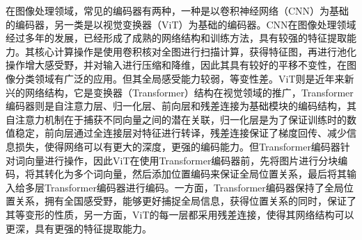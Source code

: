 \documentclass{Diploma}
\begin{document}
  在图像处理领域，常见的编码器有两种，一种是以卷积神经网络（CNN）为基础的编码器，另一类是以视觉变换器（ViT）为基础的编码器。CNN在图像处理领域经过多年的发展，已经形成了成熟的网络结构和训练方法，具有较强的特征提取能力。其核心计算操作是使用卷积核对全图进行扫描计算，获得特征图，再进行池化操作增大感受野，并对输入进行压缩和降维，因此其具有较好的平移不变性，在图像分类领域有广泛的应用。但其全局感受能力较弱，等变性差。ViT则是近年来新兴的网络结构，它是变换器（Transformer）结构在视觉领域的推广，Transformer编码器则是自注意力层、归一化层、前向层和残差连接为基础模块的编码结构，其自注意力机制在于捕获不同向量之间的潜在关联，归一化层是为了保证训练时的数值稳定，前向层通过全连接层对特征进行转译，残差连接保证了梯度回传、减少信息损失，使得网络可以有更大的深度，更强的编码能力。但Transformer编码器针对词向量进行操作，因此ViT在使用Transformer编码器前，先将图片进行分块编码，将其转化为多个词向量，然后添加位置编码来保证全局位置关系，最后将其输入给多层Transformer编码器进行编码。一方面，Transformer编码器保持了全局位置关系，拥有全国感受野，能够更好捕捉全局信息，获得位置关系的同时，保证了其等变形的性质，另一方面，ViT的每一层都采用残差连接，使得其网络结构可以更深，具有更强的特征提取能力。
\end{document}
